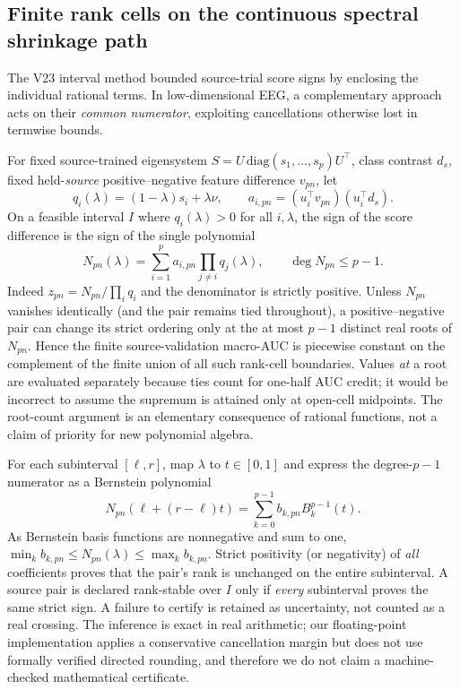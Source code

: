 \subsection{Finite rank cells on the continuous spectral shrinkage path}
\label{sec:v25-bernstein-rank-cells}
The V23 interval method bounded source-trial score signs by
enclosing the individual rational terms. In low-dimensional
EEG, a complementary approach acts on their \emph{common
numerator}, exploiting cancellations otherwise lost in
termwise bounds.

For fixed source-trained eigensystem
$S=U\,\mathrm{diag}(s_1,\ldots,s_p)U^\top$, class contrast
$d_s$, fixed held-\emph{source} positive--negative feature
difference $v_{pn}$, let
\[
q_i(\lambda)=(1-\lambda)s_i+\lambda\nu,\qquad
a_{i,pn}=(u_i^\top v_{pn})(u_i^\top d_s).
\]
On a feasible interval $I$ where $q_i(\lambda)>0$ for all
$i,\lambda$, the sign of the score difference is the sign
of the single polynomial
\begin{equation}
 N_{pn}(\lambda)
 =\sum_{i=1}^{p}a_{i,pn}\prod_{j\ne i}q_j(\lambda),
 \qquad\deg N_{pn}\le p-1 .
 \label{eq:v25-spectral-numerator}
\end{equation}
Indeed $z_{pn}=N_{pn}/\prod_iq_i$ and the denominator is
strictly positive. Unless $N_{pn}$ vanishes identically
(and the pair remains tied throughout), a positive--negative
pair can change its strict ordering only at the at most
$p-1$ distinct real roots of $N_{pn}$. Hence the finite
source-validation macro-AUC is piecewise constant on
the complement of the finite union of all such rank-cell
boundaries. Values \emph{at} a root are evaluated separately
because ties count for one-half AUC credit; it would be
incorrect to assume the supremum is attained only at
open-cell midpoints. The root-count argument is an
elementary consequence of rational functions, not a
claim of priority for new polynomial algebra.

For each subinterval $[\ell,r]$, map $\lambda$ to
$t\in[0,1]$ and express the degree-$p-1$ numerator
as a Bernstein polynomial
\[
 N_{pn}(\ell+(r-\ell)t)
 =\sum_{k=0}^{p-1} b_{k,pn}B_k^{p-1}(t).
\]
As Bernstein basis functions are nonnegative and sum to
one, $\min_k b_{k,pn}\le N_{pn}(\lambda)\le
\max_k b_{k,pn}$. Strict positivity (or negativity)
of \emph{all} coefficients proves that the pair's rank
is unchanged on the entire subinterval. A source pair
is declared rank-stable over $I$ only if \emph{every}
subinterval proves the same strict sign. A failure to
certify is retained as uncertainty, not counted as a
real crossing. The inference is exact in real arithmetic;
our floating-point implementation applies a conservative
cancellation margin but does not use formally verified
directed rounding, and therefore we do not claim a
machine-checked mathematical certificate.

